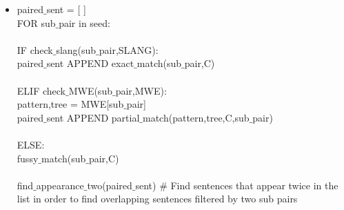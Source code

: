 \begin{itemize}
         \item[ ] paired$\_$sent = [ ]
         \\FOR sub$\_$pair in seed:
            \\\\IF check$\_$slang(sub$\_$pair,SLANG):           
                 \\paired$\_$sent  APPEND exact$\_$match(sub$\_$pair,C)                
            \\\\ ELIF check$\_$MWE(sub$\_$pair,MWE):
                \\ pattern,tree = MWE[sub$\_$pair]
                \\ paired$\_$sent  APPEND partial$\_$match(pattern,tree,C,sub$\_$pair)                 
            \\\\ELSE:
                \\fussy$\_$match(sub$\_$pair,C)              
         \\\\ find$\_$appearance$\_$two(paired$\_$sent) \# Find sentences that appear twice in the list in order to find overlapping sentences filtered by two sub pairs
\end{itemize}